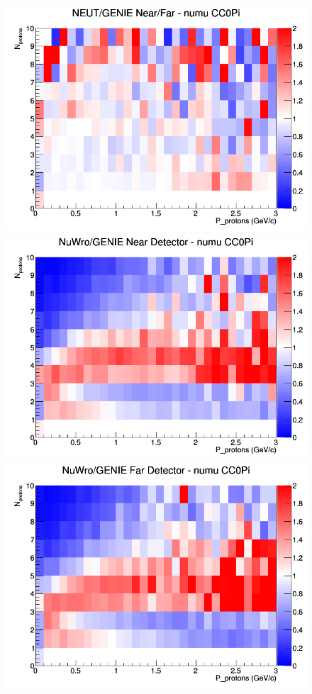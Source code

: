 \documentclass[12pt]{article}
\begin{document}
\begin{figure}[h]
\endminipage
{}
\includegraphics[width=\linewidth]{N_P/nominal/protons/ratios/CC0Pi_NEUT_GENIE_numu_NF_N_P.png}
\endminipage
\newline
{}
\includegraphics[width=\linewidth]{N_P/nominal/protons/ratios/CC0Pi_NuWro_GENIE_numu_near_N_P.png}
\endminipage
{}
\includegraphics[width=\linewidth]{N_P/nominal/protons/ratios/CC0Pi_NuWro_GENIE_numu_far_N_P.png}

\end{figure}
\end{document}
